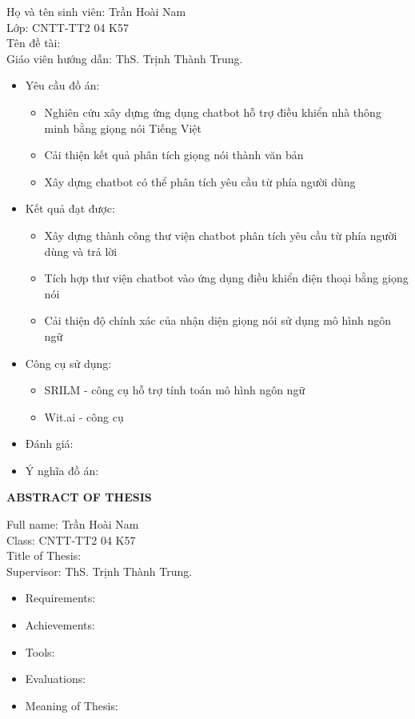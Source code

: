 \documentclass[12pt]{report}
\begin{document}
\noindent Họ và tên sinh viên: Trần Hoài Nam \\
Lớp: CNTT-TT2 04 K57\\
Tên đề tài: \\
Giáo viên hướng dẫn: ThS. Trịnh Thành Trung.\\
\begin{itemize}
	\item Yêu cầu đồ án:
		\begin{itemize}
			\item Nghiên cứu xây dựng ứng dụng chatbot hỗ trợ điều khiển nhà thông minh bằng giọng nói Tiếng Việt
			\item Cải thiện kết quả phân tích giọng nói thành văn bản
			\item Xây dựng chatbot có thể phân tích yêu cầu từ phía người dùng
		\end{itemize}
	\item Kết quả đạt được:
		\begin{itemize}
			\item Xây dựng thành công thư viện chatbot phân tích yêu cầu từ phía người dùng và trả lời
			\item Tích hợp thư viện chatbot vào ứng dụng điều khiển điện thoại bằng giọng nói
			\item Cải thiện độ chính xác của nhận diện giọng nói sử dụng mô hình ngôn ngữ
		\end{itemize}
	\item Công cụ sử dụng:
		\begin{itemize}
			
			\item SRILM - công cụ hỗ trợ tính toán mô hình ngôn ngữ
			\item Wit.ai - công cụ 
		\end{itemize}
	\item Đánh giá:
	\item Ý nghĩa đồ án:
\end{itemize}

\newpage

\begin{center}
{\large \textbf{ABSTRACT OF THESIS}}
\end{center}

\noindent Full name: Trần Hoài Nam \\
Class: CNTT-TT2 04 K57\\
Title of Thesis: \\
Supervisor: ThS. Trịnh Thành Trung.\\
\begin{itemize}
	\item Requirements:
	\item Achievements:
	\item Tools:
	\item Evaluations:
	\item Meaning of Thesis:
\end{itemize}
\end{document}
